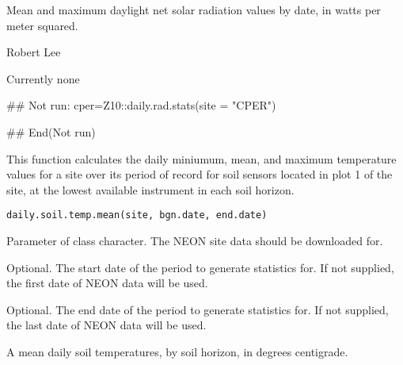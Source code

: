 \documentclass[a4paper]{book}
\begin{document}
%
\begin{Value}
Mean and maximum daylight net solar radiation values by date,
in watts per meter squared.
\end{Value}
%
\begin{Author}\relax
Robert Lee \\{}
\end{Author}
%
\begin{SeeAlso}\relax
Currently none
\end{SeeAlso}
%
\begin{Examples}
\begin{ExampleCode}
## Not run: 
cper=Z10::daily.rad.stats(site = "CPER")

## End(Not run)
\end{ExampleCode}
\end{Examples}
%
\begin{Description}\relax
This function calculates the daily miniumum, mean, and maximum
temperature values for a site over its period of record for soil sensors located
in plot 1 of the site, at the lowest available instrument in each soil horizon.
\end{Description}
%
\begin{Usage}
\begin{verbatim}
daily.soil.temp.mean(site, bgn.date, end.date)
\end{verbatim}
\end{Usage}
%
\begin{Arguments}
\begin{ldescription}
\item[\code{site}] Parameter of class character.
The NEON site data should be downloaded for.

\item[\code{bgn.date}] Optional. The start date of the period to generate statistics for.
If not supplied, the first date of NEON data will be used.

\item[\code{end.date}] Optional. The end date of the period to generate statistics for.
If not supplied, the last date of NEON data will be used.
\end{ldescription}
\end{Arguments}
%
\begin{Value}
A mean daily soil temperatures, by soil horizon, in degrees centigrade.
\end{Value}
\end{document}
